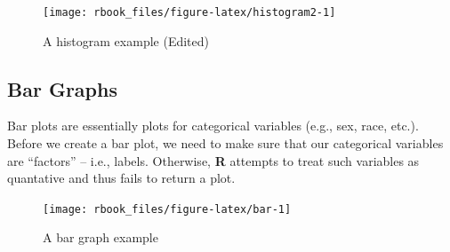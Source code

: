 \documentclass[]{book}
\newenvironment{Shaded}{\begin{snugshade}}{\end{snugshade}}
\newcommand{\CommentTok}[1]{\textcolor[rgb]{0.56,0.35,0.01}{\textit{#1}}}
\newcommand{\DataTypeTok}[1]{\textcolor[rgb]{0.13,0.29,0.53}{#1}}
\newcommand{\DecValTok}[1]{\textcolor[rgb]{0.00,0.00,0.81}{#1}}
\newcommand{\KeywordTok}[1]{\textcolor[rgb]{0.13,0.29,0.53}{\textbf{#1}}}
\newcommand{\NormalTok}[1]{#1}
\newcommand{\OperatorTok}[1]{\textcolor[rgb]{0.81,0.36,0.00}{\textbf{#1}}}
\newcommand{\StringTok}[1]{\textcolor[rgb]{0.31,0.60,0.02}{#1}}
\begin{document}
\begin{Shaded}
\end{Shaded}

\begin{figure}

{\centering \texttt{[image: rbook\_files/figure-latex/histogram2-1]} 

}

\caption{A histogram example (Edited)}\label{fig:histogram2}
\end{figure}

\hypertarget{bar-graphs}{%
\subsection{Bar Graphs}\label{bar-graphs}}

Bar plots are essentially plots for categorical variables (e.g., sex, race, etc.). Before we create a bar plot, we need to make sure that our categorical variables are ``factors'' -- i.e., labels. Otherwise, \textbf{R} attempts to treat such variables as quantative and thus fails to return a plot.

\begin{Shaded}
\end{Shaded}

\begin{figure}

{\centering \texttt{[image: rbook\_files/figure-latex/bar-1]} 

}

\caption{A bar graph example}\label{fig:bar}
\end{figure}
\end{document}
